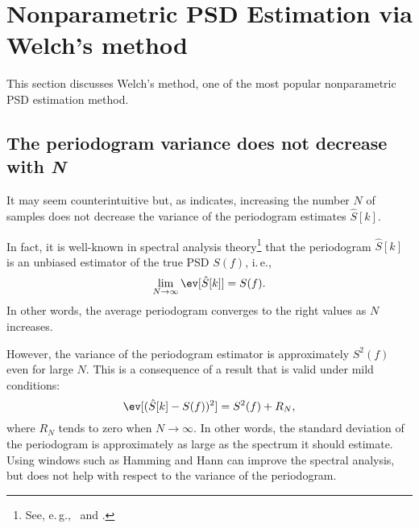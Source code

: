\section{Nonparametric PSD Estimation via Welch's method}
\label{sec:welch}


This section discusses Welch's method, one of the most popular nonparametric PSD estimation method.

\subsection{The periodogram variance does not decrease with \emph{N}}

It may seem counterintuitive but, as  indicates, 
increasing the number $N$ of samples does not decrease the variance of the periodogram estimates $\hat S[k]$. 

In fact, it is well-known in spectral analysis theory\footnote{See, e.\,g.,~\cite{Hayes96,Stoica05} and .} that the periodogram $\hat S[k]$ is an unbiased estimator of the true PSD $S(f)$, i.\,e.,
\[
\lim_{N \rightarrow \infty} \ev[\hat S[k]] = S(f).
\]
In other words, the average periodogram converges to the right values as $N$ increases.

However, the variance of the periodogram estimator is approximately $S^2(f)$ even for large $N$. This is a consequence of a result that is valid under mild conditions:
\begin{equation}
\ev[ (\hat S[k] - S(f))^2 ] = S^2(f) + R_N,
\label{eq:variancePSD}
\end{equation}
where $R_N$ tends to zero when $N \rightarrow \infty$.
In other words, the standard deviation of the periodogram is approximately as large as the spectrum it should estimate.
Using windows such as Hamming and Hann can improve the spectral analysis, but does not help with respect to the variance of the periodogram.

